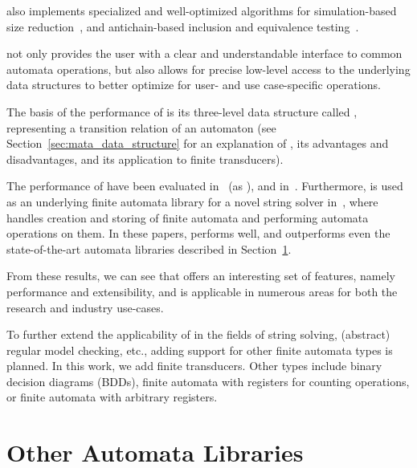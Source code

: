 \mata also implements specialized and well-optimized algorithms for simulation-based size reduction~\cite{ranzato_efficient_2010, treesimulation08}, and antichain-based inclusion and equivalence testing~\cite{doyen-antichain-10}.

\mata not only provides the user with a clear and understandable interface to common automata operations, but also allows for precise low-level access to the underlying data structures to better optimize for user- and use case-specific operations.

The basis of the performance of \mata is its three-level data structure called \deltastruct, representing a transition relation of an automaton (see Section~\ref{sec:mata_data_structure} for an explanation of \deltastruct, its advantages and disadvantages, and its application to finite transducers).

The performance of \mata have been evaluated in~\cite{cade23_reasoning_regular_properties_comparision_DBLP:conf/cade/FiedorHHRSV23} (as \enfa), and in~\cite{tacas24_mata_10.1007/978-3-031-57249-4_7}.
Furthermore, \mata is used as an underlying finite automata library for a novel string solver \noodler in~\cite{fm23_equations_synergy_regular_constraints_DBLP:conf/fm/BlahoudekCCHHLS23, oopsla23_stabilization_DBLP:journals/pacmpl/ChenCHHLS23,tacas24_noodler_10.1007/978-3-031-57246-3_2}, where \mata handles creation and storing of finite automata and performing automata operations on them.
In these papers, \mata performs well, and outperforms even the state-of-the-art automata libraries described in Section~\ref{sec:other_automata_libraries}.

From these results, we can see that \mata offers an interesting set of features, namely performance and extensibility, and is applicable in numerous areas for both the research and industry use-cases.

To further extend the applicability of \mata in the fields of string solving, (abstract) regular model checking, etc., adding support for other finite automata types is planned.
In this work, we add finite transducers.
Other types include binary decision diagrams (BDDs), finite automata with registers for counting operations, or finite automata with arbitrary registers.



\section{Other Automata Libraries}
\label{sec:other_automata_libraries}

